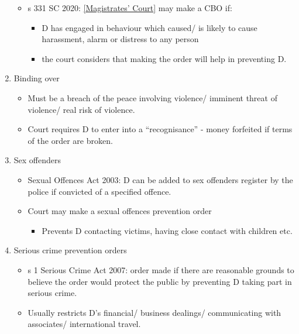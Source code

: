 \documentclass[
]{article}
\providecommand{\tightlist}{%
  \setlength{\itemsep}{0pt}\setlength{\parskip}{0pt}}
\begin{document}
\begin{enumerate}
  \begin{itemize}
  \tightlist
  \item
    s 331 SC 2020:
    \href{maximum\%20compensation\%20of\%20£5,000\%20per\%20offence}{{[}Magistrates'
    Court{]}} may make a CBO if:

    \begin{itemize}
    \tightlist
    \item
      D has engaged in behaviour which caused/ is likely to cause
      harassment, alarm or distress to any person
    \item
      the court considers that making the order will help in preventing
      D.
    \end{itemize}
  \end{itemize}
\item
  Binding over

  \begin{itemize}
  \tightlist
  \item
    Must be a breach of the peace involving violence/ imminent threat of
    violence/ real risk of violence.
  \item
    Court requires D to enter into a ``recognisance'' - money forfeited
    if terms of the order are broken.
  \end{itemize}
\item
  Sex offenders

  \begin{itemize}
  \tightlist
  \item
    Sexual Offences Act 2003: D can be added to sex offenders register
    by the police if convicted of a specified offence.
  \item
    Court may make a sexual offences prevention order

    \begin{itemize}
    \tightlist
    \item
      Prevents D contacting victims, having close contact with children
      etc.
    \end{itemize}
  \end{itemize}
\item
  Serious crime prevention orders

  \begin{itemize}
  \tightlist
  \item
    s 1 Serious Crime Act 2007: order made if there are reasonable
    grounds to believe the order would protect the public by preventing
    D taking part in serious crime.
  \item
    Usually restricts D's financial/ business dealings/ communicating
    with associates/ international travel.
  \end{itemize}
\end{enumerate}
\end{document}
